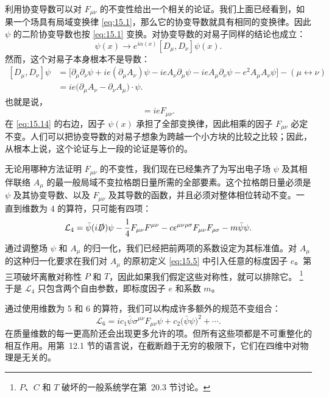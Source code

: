 利用协变导数可以对 $F_{\mu\nu}$ 的不变性给出一个相关的论证。我们上面已经看到，如果一个场具有局域变换律 \eqref{eq:15.1}，那么它的协变导数就具有相同的变换律。因此 $\psi$ 的二阶协变导数也按 \eqref{eq:15.1} 变换。对协变导数的对易子同样的结论也成立：
\begin{equation}
  [D_\mu, D_\nu]\psi(x) \to e^{i\alpha(x)}[D_\mu, D_\nu]\psi(x) .
  \label{eq:15.14}
\end{equation}
然而，这个对易子本身根本不是导数：
\begin{equation}
  \begin{aligned}
    [D_\mu, D_\nu]\psi &= \bigl[ \partial_\mu\partial_\nu\psi
      + ie(\partial_\mu A_\nu) \psi - ie A_\nu\partial_\mu\psi
      - ie A_\mu\partial_\nu\psi - e^2A_\mu A_\nu\psi \bigr] - (\mu\leftrightarrow\nu)\\
    &= ie\bigl( \partial_\mu A_\nu - \partial_\nu A_\mu \bigr)\cdot\psi .
  \end{aligned}
  \label{eq:15.16}
\end{equation}
也就是说，
\begin{equation}
  [D_\mu, D_\nu] = ieF_{\mu\nu} .
\end{equation}
在 \eqref{eq:15.14} 的右边，因子 $\psi(x)$ 承担了全部变换律，因此相乘的因子 $F_{\mu\nu}$ 必定不变。人们可以把协变导数的对易子想象为跨越一个小方块的比较之比较；因此，从根本上说，这个论证与上一段的论证是等价的。

无论用哪种方法证明 $F_{\mu\nu}$ 的不变性，我们现在已经集齐了为写出电子场 $\psi$ 及其相伴联络 $A_\mu$ 的最一般局域不变拉格朗日量所需的全部要素。这个拉格朗日量必须是 $\psi$ 及其协变导数、以及 $F_{\mu\nu}$ 及其导数的函数，并且必须对整体相位转动不变。一直到维数为 4 的算符，只可能有四项：
\begin{equation}
  \mathcal{L}_4 = \bar{\psi}(i\slashed{D})\psi - \frac{1}{4}F_{\mu\nu}F^{\mu\nu}
    - c\epsilon^{\mu\nu\rho\sigma}F_{\mu\nu}F_{\rho\sigma} - m\bar{\psi}\psi .
  \label{eq:15.17}
\end{equation}
通过调整场 $\psi$ 和 $A_\mu$ 的归一化，我们已经把前两项的系数设定为其标准值。对 $A_\mu$ 的这种归一化要求在我们对 $A_\mu$ 的原初定义 \eqref{eq:15.5} 中引入任意的标度因子 $e$。第三项破坏离散对称性 $P$ 和 $T$，因此如果我们假定这些对称性，就可以排除它。%
\footnote{$P$、$C$ 和 $T$ 破坏的一般系统学在第~20.3 节讨论。} 于是 $\mathcal{L}_4$ 只包含两个自由参数，即标度因子 $e$ 和系数 $m$。

通过使用维数为 5 和 6 的算符，我们可以构成许多额外的规范不变组合：
\begin{equation}
  \mathcal{L}_6 = i c_1\bar{\psi}\sigma^{\mu\nu}F_{\mu\nu}\psi
    + c_2\bigl( \bar{\psi}\psi \bigr)^2 + \cdots .
  \label{eq:15.18}
\end{equation}
在质量维数的每一更高阶还会出现更多允许的项。但所有这些项都是不可重整化的相互作用。用第~12.1 节的语言说，在截断趋于无穷的极限下，它们在四维中对物理是无关的。


